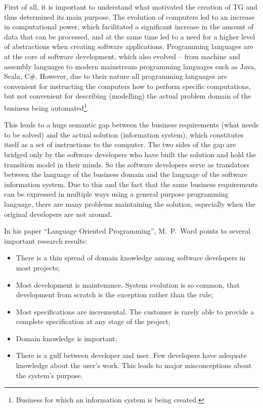   First of all, it is important to understand what motivated the creation of TG and thus determined its main purpose.
  The evolution of computers led to an increase in computational power, which facilitated a significant increase in the amount of data that can be processed, and at the same time led to a need for a higher level of abstractions when creating software applications.
  Programming languages are at the core of software development, which also evolved -- from machine and assembly languages to modern mainstream programming languages such as Java, Scala, C\#.
  However, due to their nature all programming languages are convenient for instructing the computers how to perform specific computations, but not convenient for describing (modelling) the actual problem domain of the business being automated\footnote{Business for which an information system is being created.}.
  
  This leads to a huge semantic gap between the business requirements (what needs to be solved) and the actual solution (information system), which constitutes itself as a set of instructions to the computer.
  The two sides of the gap are bridged only by the software developers who have built the solution and hold the transition model in their minds.
  So the software developers serve as translators between the language of the business domain and the language of the software information system.
  Due to this and the fact that the same business requirements can be expressed in multiple ways using a general purpose programming language, there are many problems maintaining the solution, especially when the original developers are not around.

  In his paper ``Language Oriented Programming'', M.~P.~Ward points to several important research results:
  \begin{itemize}
    \item There is a thin spread of domain knowledge among software developers in most projects;    
    \item Most development is maintenance. 
	  System evolution is so common, that development from scratch is the exception rather than the rule;
    \item Most specifications are incremental. 
	  The customer is rarely able to provide a complete specification at any stage of the project;
    \item Domain knowledge is important;
    \item There is a gulf between developer and user. 
	  Few developers have adequate knowledge about the user's work. 
	  This leads to major misconceptions about the system's purpose.
  \end{itemize}
  
